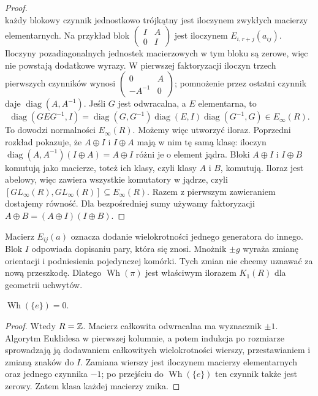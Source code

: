 \begin{proof}
\[\]
każdy blokowy czynnik jednostkowo trójkątny
jest iloczynem zwykłych macierzy elementarnych.
Na przykład blok $\left(\begin{smallmatrix}I&A\\0&I\end{smallmatrix}\right)$
jest iloczynem $E_{i,r+j}(a_{ij})$. Iloczyny pozadiagonalnych
jednostek macierzowych w tym bloku są zerowe, więc nie powstają
dodatkowe wyrazy. W pierwszej faktoryzacji iloczyn trzech
pierwszych czynników wynosi
$\left(\begin{smallmatrix}0&A\\-A^{-1}&0\end{smallmatrix}\right)$;
pomnożenie przez ostatni czynnik daje $\operatorname{diag}(A,A^{-1})$.
Jeśli $G$ jest odwracalna, a $E$ elementarna,
to
\[
 \operatorname{diag}(GEG^{-1},I)
 =\operatorname{diag}(G,G^{-1})
  \operatorname{diag}(E,I)
  \operatorname{diag}(G^{-1},G)
 \in E_\infty(R).
\]
To dowodzi normalności $E_\infty(R)$.
Możemy więc utworzyć iloraz. Poprzedni rozkład
pokazuje, że $A\oplus I$ i $I\oplus A$ mają
w nim tę samą klasę: iloczyn
$\operatorname{diag}(A,A^{-1})(I\oplus A)=A\oplus I$
różni je o element jądra. Bloki $A\oplus I$ i $I\oplus B$
komutują jako macierze, toteż ich klasy, czyli
klasy $A$ i $B$, komutują. Iloraz jest abelowy,
więc zawiera wszystkie komutatory w jądrze,
czyli $[GL_\infty(R),GL_\infty(R)]\subseteq E_\infty(R)$.
Razem z pierwszym zawieraniem dostajemy równość.
Dla bezpośredniej sumy używamy faktoryzacji
$A\oplus B=(A\oplus I)(I\oplus B)$.
\end{proof}

Macierz $E_{ij}(a)$ oznacza dodanie wielokrotności
jednego generatora do innego. Blok $I$ odpowiada
dopisaniu pary, która się znosi. Mnożnik $\pm g$
wyraża zmianę orientacji i podniesienia pojedynczej
komórki. Tych zmian nie chcemy uznawać za nową
przeszkodę. Dlatego $\operatorname{Wh}(\pi)$ jest
właściwym ilorazem $K_1(R)$ dla geometrii uchwytów.

\begin{stwierdzenie}
\label{prop:wh-trywialna-20}
$\operatorname{Wh}(\{e\})=0$.
\end{stwierdzenie}
\begin{proof}
Wtedy $R=\mathbb{Z}$. Macierz całkowita odwracalna ma
wyznacznik $\pm1$. Algorytm Euklidesa w pierwszej
kolumnie, a potem indukcja po rozmiarze sprowadzają
ją dodawaniem całkowitych wielokrotności wierszy,
przestawianiem i zmianą znaków do $I$. Zamiana
wierszy jest iloczynem macierzy elementarnych oraz
jednego czynnika $-1$; po przejściu do
$\operatorname{Wh}(\{e\})$ ten czynnik także jest
zerowy. Zatem klasa każdej macierzy znika.
\end{proof}

